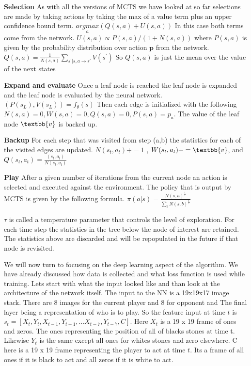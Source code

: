    \textbf{Selection} As with all the versions of MCTS we have looked at so far selections are made by taking actions by taking the max of a value term plus an upper confidence bound term. $\underset{a}{argmax} (Q(s,a) + U(s,a))$ In this case both terms come from the network. $U(s,a) \propto P(s,a) / (1 + N(s,a)) $ where $P(s,a) $ is given by the probability distribution over action $\textbf{p}$ from the network. $Q(s,a) = \frac{1}{N(s,a)}\sum_{s^{'}|s,a \rightarrow s^{'}}V(s^{'})$ So $Q(s,a)$ is just the mean over the value of the next states
   
   \textbf{Expand and evaluate} Once a leaf node is reached the leaf node is expanded and the leaf node is evaluated by the neural network. $ (P(s_{L}),V(s_{L})) = f_{\theta}(s) $ Then each edge is initialized with the following $ N(s,a) = 0,W(s,a) = 0,Q(s,a) = 0,P(s,a) = p_{a} $. The value of the leaf node $\textbb{v}$ is backed up. 
   
   \textbf{Backup} For each step that was visited from step (a,b) the statistics for each of the visited edges are
   updated. $N(s_{t},a_{t}) += 1$ , $W(s_{t},a_{t}) += \textbb{v} $, and $Q(s_{t},a_{t})=\frac{(s_{t},a_{t})}{N(s_{t},a_{t})} $
   
   \textbf{Play} After a given number of iterations from the current node an action is selected and executed against the environment. The policy that is output by MCTS is given by the following formula. $\pi(a|s) = \frac{N(s,a)^{\frac{1}{\tau}}}{\sum_{b}N(s,b)^{\frac{1}{\tau}}}$
       
   $\tau$ is called a temperature parameter that controls the level of exploration. For each time step the statistics in the tree below the node of interest are retained. The statistics above are discarded and will be repopulated in the future if that node is revisited.
   
   We will now turn to focusing on the deep learning aspect of the algorithm. We have already discussed how data is collected and what loss function is used while training. Lets start with what the input looked like and than look at the architecture of the network itself. The input to the NN is a 19x19x17 image stack. There are 8 images for the current player and 8 for opponent and The final layer being a representation of who is to play. So the feature input at time $t$ is $s_{t} = [X_{t},Y_{t},X_{t - 1},Y_{t -1},... X_{t-7},Y_{t-7},C]$. Here $X_{t}$ is a 19 x 19 frame of ones and zeros. The ones representing the position of all of blacks stones at time t. Likewise $Y_{t}$ is the same except all ones for whites stones and zero elsewhere. C here is a 19 x 19 frame representing the player to act at time $t$. Its a frame of all ones if it is black to act and all zeros if it is white to act. 
   
